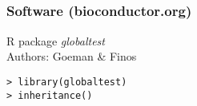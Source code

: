 \subsection{}
\begin{frame}[fragile]
\frametitle{Software (bioconductor.org)}

R package \emph{globaltest}\\
Authors: Goeman \& Finos
\eb
  
\begin{verbatim}
> library(globaltest)
> inheritance()

\end{verbatim}  

\end{frame}

% 
% 
% 
